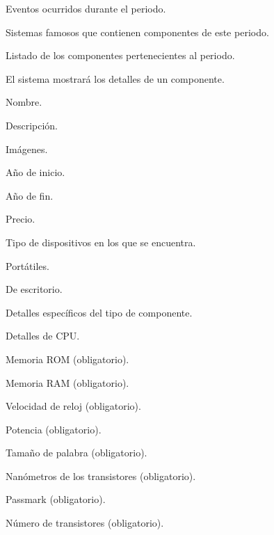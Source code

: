\begin{myEnumRFM}
\begin{myEnumRFM}
		\item Eventos ocurridos durante el periodo.
		\item Sistemas famosos que contienen componentes de este periodo.
		\item Listado de los componentes pertenecientes al periodo.
	\end{myEnumRFM}
	\item\label{it:detalles_comp} El sistema mostrará los detalles de un componente.
	\begin{myEnumRFM}
		\item Nombre.
		\item Descripción.
		\item Imágenes.
		\item Año de inicio.
		\item Año de fin.
		\item Precio.
		\item Tipo de dispositivos en los que se encuentra.
		\begin{myEnumRFM}
			\item Portátiles.
			\item De escritorio.
		\end{myEnumRFM}
		\item Detalles específicos del tipo de componente.
		\begin{myEnumRFM}
			\item Detalles de CPU.
			\begin{myEnumRFM}
				\item Memoria ROM (obligatorio).
				\item Memoria RAM (obligatorio).
				\item Velocidad de reloj (obligatorio).
				\item Potencia (obligatorio).
				\item Tamaño de palabra (obligatorio).
				\item Nanómetros de los transistores (obligatorio).
				\item Passmark (obligatorio).
				\item Número de transistores (obligatorio).
			\end{myEnumRFM}
		\end{myEnumRFM}
	\end{myEnumRFM}
\end{myEnumRFM}

